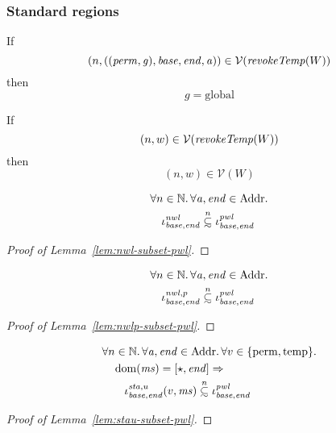 \documentclass[a4paper]{article}
\newcommand\subsetsim{\mathrel{\ooalign{\raise.2ex\hbox{$\subset$}\cr
      \hidewidth\lower.8ex\hbox{\scalebox{0.9}{$\sim$}}\hidewidth\cr}}}
\newcommand{\nsubsim}[1][n]{\stackrel{\tiny{#1}}{\subsetsim}}
\DeclareMathOperator{\dom}{dom}
\newcommand{\var}[1]{\mathit{#1}}
\newcommand{\hs}{\var{ms}}
\newcommand{\ms}{\hs}
\newcommand{\gl}{\var{g}}
\newcommand{\addr}{\var{a}}
\newcommand{\start}{\var{base}}
\newcommand{\addrend}{\var{end}}
\newcommand{\perm}{\var{perm}}
\newcommand{\stdcap}[1][(\perm,\gl)]{\left(#1,\start,\addrend,\addr \right)}
\newcommand{\nwl}{\var{nwl}}
\newcommand{\pwl}{\var{pwl}}
\newcommand{\sta}{\var{sta}}
\newcommand{\plainfun}[2]{
  \ifthenelse{\equal{#2}{}}
  {\mathit{#1}}
  {\mathit{#1}(#2)}
}
\newcommand{\revokeTemp}[1]{\plainfun{revokeTemp}{#1}}
\newcommand{\asmType}{\plaindom{AsmType}}
\newcommand{\plaindom}[1]{\mathrm{#1}}
\newcommand{\Addrs}{\plaindom{Addr}}
\newcommand{\nats}{\mathbb{N}}
\newcommand{\intr}[2]{\mathcal{#1}}
\newcommand{\valueintr}[1]{\intr{V}{#1}}
\newcommand{\stdvr}{\valueintr{\asmType}}
\newcommand{\npair}[2][n]{\left(#1,#2 \right)}
\newcommand{\plainperm}[1]{\mathrm{#1}}
\newcommand{\glob}{\plainperm{global}}
\newcommand{\plainview}[1]{\mathrm{#1}}
\newcommand{\perma}{\plainview{perm}}
\newcommand{\temp}{\plainview{temp}}
\begin{document}
\subsubsection{Standard regions}
\begin{lemma}
  If
  \[
    \npair{\stdcap} \in \stdvr(\revokeTemp{W})
  \]
  then 
  \[
    \gl = \glob
  \]
\end{lemma}
\begin{lemma}
  If
  \[
    \npair{w} \in \stdvr(\revokeTemp{W})
  \]
  then
  \[
    \npair{w} \in \stdvr(W)
  \]
\end{lemma}

\begin{lemma}
  \label{lem:nwl-subset-pwl}
  \begin{align*}
    & \forall n \in \nats\ldotp \forall \addr, \addrend \in \Addrs \ldotp  \\
    & \quad \iota^\nwl_{\start,\addrend} \nsubsim \iota^\pwl_{\start,\addrend}
  \end{align*}
\end{lemma}
\begin{proof}[Proof of Lemma~\ref{lem:nwl-subset-pwl}]
  
\end{proof}

\begin{lemma}
  \label{lem:nwlp-subset-pwl}
  \begin{align*}
    & \forall n \in \nats\ldotp \forall \addr, \addrend \in \Addrs \ldotp  \\
    & \quad \iota^{\nwl,p}_{\start,\addrend}  \nsubsim \iota^\pwl_{\start,\addrend}
  \end{align*}
\end{lemma}
\begin{proof}[Proof of Lemma~\ref{lem:nwlp-subset-pwl}]
  
\end{proof}

\begin{lemma}
  \label{lem:stau-subset-pwl}
  \begin{align*}
    & \forall n \in \nats\ldotp \forall \addr, \addrend \in \Addrs \ldotp \forall v \in \{\perma, \temp\} \ldotp \\
    & \quad \dom(\ms) = [\star,\addrend] \Rightarrow \\
    & \qquad \iota^{\sta,u}_{\start,\addrend}(v,\ms) \nsubsim \iota^\pwl_{\start,\addrend}
  \end{align*}
\end{lemma}
\begin{proof}[Proof of Lemma~\ref{lem:stau-subset-pwl}]
  
\end{proof}
\end{document}
